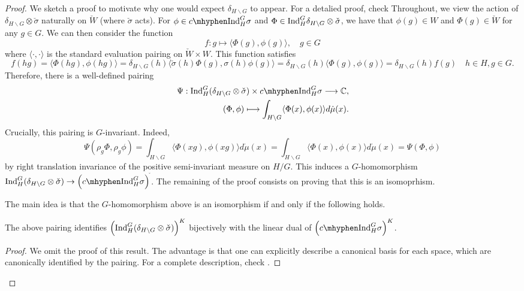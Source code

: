 \begin{proof}
    We sketch a proof to motivate why one would expect $\delta_{H\backslash G}$ to appear. For a detalied proof, check \cite[]{BH1}
    Throughout, we view the action of $\delta_{H\backslash G}\otimes\check{\sigma}$ naturally on $\check{W}$ (where $\check{\sigma}$ acts). For $\phi\in \cInd_H^G\sigma$ and $\Phi\in\mathrm{Ind}_H^G\delta_{H\backslash G}\otimes\check{\sigma}$, 
    we have that $\phi(g)\in W$ and $\Phi(g)\in\check{W}$ for any $g\in G$. We can then consider the function $$f:g\longmapsto\langle\Phi(g),\phi(g)\rangle,\quad g\in G $$ 
    where $\langle\cdot,\cdot\rangle$ is the standard evaluation pairing on $\check{W}\times W$. This function satisfies 
    $$f(hg)=\langle\Phi(hg),\phi(hg)\rangle=\delta_{H\backslash G}(h)\langle\check{\sigma}(h)\Phi(g),\sigma(h)\phi(g)\rangle=\delta_{H\backslash G}(h)\langle\Phi(g),\phi(g)\rangle=\delta_{H\backslash G}(h)f(g)\quad h\in H, g\in G.$$
    Therefore, there is a well-defined pairing 
    \begin{align*}
        \Psi:\Ind_H^G(\delta_{H\backslash G}\otimes\check{\sigma})\times \cInd_H^G\sigma\longrightarrow\CC&,\\
        (\Phi,\phi)\longmapsto\int_{H\backslash G}\langle\Phi(x),\phi(x)\rangle d\dot{\mu}(x)&.
    \end{align*}
    Crucially, this pairing is $G$-invariant. Indeed, 
    $$\Psi(\rho_g\Phi,\rho_g\phi)=\int_{H\backslash G}\langle\Phi(xg),\phi(xg)\rangle d\dot{\mu}(x)=\int_{H\backslash G}\langle\Phi(x),\phi(x)\rangle d\dot{\mu}(x)=\Psi(\Phi,\phi)$$
    by right translation invariance of the positive semi-invariant measure on $H/G$. 
    This induces a $G$-homomorphism $\Ind_H^G(\delta_{H\backslash G}\otimes \check{\sigma})\to \left(\cInd_H^G\sigma \right)^{\check{}}$. The remaining of the proof consists on proving that this is an isomoprhism.

    The main idea is that the $G$-homomorphism above is an isomorphism if and only if the following holds.
    \begin{lemma}
        The above pairing identifies $\left(\mathrm{Ind}_H^G(\delta_{H\backslash G}\otimes \check{\sigma})\right)^K$ bijectively with the linear dual of $\left(\cInd_H^G\sigma \right)^K$.
    \end{lemma}
    \begin{proof}
        We omit the proof of this result. The advantage is that one can explicitly describe a canonical basis for each space, which are canonically identified by the pairing. For a complete description, check \cite[3.5 Lemma 2]{BH1}.
    \end{proof}
\end{proof}